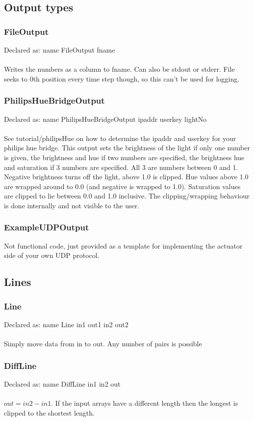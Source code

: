 \documentclass[a4paper]{article}
\begin{document}
\subsection{Output types}
\subsubsection{FileOutput}
Declared as: name FileOutput fname\\\\
Writes the numbers as a column to fname. Can also be stdout or stderr.
File seeks to 0th position every time step though, so this can't be used for logging.
\subsubsection{PhilipsHueBridgeOutput}
Declared as: name PhilipsHueBridgeOutput ipaddr userkey lightNo\\\\
See tutorial/philipsHue on how to determine the ipaddr and userkey for your philips hue bridge.
This output sets the brightness of the light if only one number is given, the brightness and hue if two numbers are specified, the brightness hue and saturation if 3 numbers are specified. All 3 are numbers between 0 and 1. Negative brightness turns off the light, above 1.0 is clipped. Hue values above 1.0 are wrapped around to 0.0 (and negative is wrapped to 1.0). Saturation values are clipped to lie between 0.0 and 1.0 inclusive. The clipping/wrapping behaviour is done internally and not visible to the user.
\subsubsection{ExampleUDPOutput}
Not functional code, just provided as a template for implementing the actuator side of your own UDP protocol.
\subsection{Lines}
\subsubsection{Line}
Declared as: name Line in1 out1 in2 out2\\\\
Simply move data from in to out. Any number of pairs is possible
\subsubsection{DiffLine}
Declared as: name DiffLine in1 in2 out\\\\
$out = in2 - in1$. If the input arrays have a different length then the longest is clipped to the shortest length.
\end{document}
